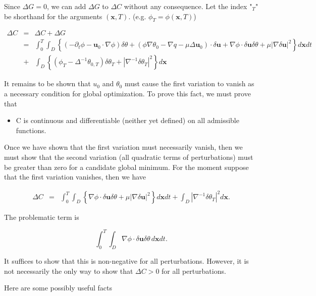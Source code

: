 \documentclass[11pt]{article}
\def \iint {\int_{0}^{T}\int_{D}}
\begin{document}
\begin{flushleft}
Since $\Delta G=0$, we can add  $\Delta G$ to $\Delta C$ without any consequence. Let the index "$_{T}$" be shorthand for the arguments $(\mathbf{x},T)$. (e.g. $\phi_{T}=\phi(\mathbf{x},T)$)


  \begin{eqnarray*}
 	\Delta C&=& \Delta C+\Delta G \\
 	         &=& \iint \left\{
  			(-\partial_{t}\phi-\mathbf{u}_{0}\cdot\nabla\phi)\delta\theta
			+( \phi \nabla\theta_{0} - \nabla q -\mu \Delta \mathbf{u}_{0})\cdot \delta\mathbf{u}
			 +\nabla\phi\cdot\delta\mathbf{u}\delta \theta 
			 +\mu |\nabla\delta \mathbf{u}|^{2}  
  		\right\}d\mathbf{x}dt \\
		  &+& \int_{D}\left\{
  			(\phi_{T}-\Delta^{-1}\theta_{0,T})\delta\theta_{T}
   			+|\nabla^{-1} 
			\delta\theta_{T}|^{2}
	       \right\} d\mathbf{x}		
\end{eqnarray*}
 

It remains to be shown that $u_{0}$ and $\theta_{0}$ must cause the first variation to vanish as a necessary condition for global optimization. To prove this fact, we must prove that

\begin{itemize}
\item C is continuous and differentiable (neither yet defined) on all admissible functions. 
\end{itemize}

Once we have shown that the first variation must necessarily vanish, then we must show that the second variation (all quadratic terms of perturbations) must be greater than zero for a candidate global minimum. For the moment suppose that the first variation vanishes, then we have

  \begin{eqnarray*}
 	\Delta C&=& \iint \left\{\nabla\phi\cdot\delta\mathbf{u}\delta \theta 
			 +\mu |\nabla\delta \mathbf{u}|^{2}  
  		\right\}d\mathbf{x}dt +\int_{D}
  			|\nabla^{-1} 
			\delta\theta_{T}|^{2}
	      d\mathbf{x}.	
\end{eqnarray*}

The problematic term is

\[
\iint \nabla\phi\cdot\delta\mathbf{u}\delta \theta \, d\mathbf{x}dt.
\]

It suffices to show that this is non-negative for all perturbations. However, it is not necessarily the only way to show that $\Delta C>0$ for all perturbations. 

Here are some possibly useful facts


\end{flushleft}
\end{document}
